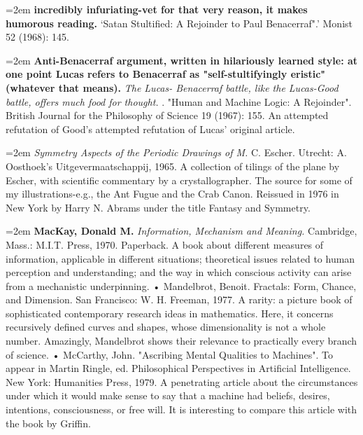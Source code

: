 \par\noindent\hangindent=2em {\bf incredibly infuriating-vet for that very reason, it makes humorous reading.} `Satan Stultified: A Rejoinder to Paul Benacerraf".' Monist 52 (1968): 145.

\par\noindent\hangindent=2em {\bf Anti-Benacerraf argument, written in hilariously learned style: at one point Lucas refers to Benacerraf as "self-stultifyingly eristic" (whatever that means).} {\it The Lucas- Benacerraf battle, like the Lucas-Good battle, offers much food for thought.} . "Human and Machine Logic: A Rejoinder". British Journal for the Philosophy of Science 19 (1967): 155. An attempted refutation of Good's attempted refutation of Lucas' original article.

\par\noindent\hangindent=2em  {\it Symmetry Aspects of the Periodic Drawings of M.} C. Escher. Utrecht: A. Oosthoek's Uitgevermaatschappij, 1965. A collection of tilings of the plane by Escher, with scientific commentary by a crystallographer. The source for some of my illustrations-e.g., the Ant Fugue and the Crab Canon. Reissued in 1976 in New York by Harry N. Abrams under the title Fantasy and Symmetry.

\par\noindent\hangindent=2em {\bf MacKay, Donald M.} {\it Information, Mechanism and Meaning.} Cambridge, Mass.: M.I.T. Press, 1970. Paperback. A book about different measures of information, applicable in different situations; theoretical issues related to human perception and understanding; and the way in which conscious activity can arise from a mechanistic underpinning. • Mandelbrot, Benoit. Fractals: Form, Chance, and Dimension. San Francisco: W. H. Freeman, 1977. A rarity: a picture book of sophisticated contemporary research ideas in mathematics. Here, it concerns recursively defined curves and shapes, whose dimensionality is not a whole number. Amazingly, Mandelbrot shows their relevance to practically every branch of science. • McCarthy, John. "Ascribing Mental Qualities to Machines". To appear in Martin Ringle, ed. Philosophical Perspectives in Artificial Intelligence. New York: Humanities Press, 1979. A penetrating article about the circumstances under which it would make sense to say that a machine had beliefs, desires, intentions, consciousness, or free will. It is interesting to compare this article with the book by Griffin.

